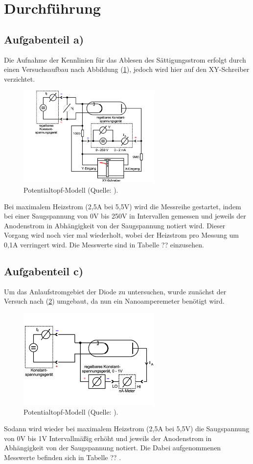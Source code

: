 \newpage
\section{Durchführung}
\subsection{Aufgabenteil a)}
Die Aufnahme der Kennlinien für das Ablesen des Sättigungsstrom erfolgt durch einen Versuchsaufbau nach Abbildung (\ref{fig:aufbau1}), 
jedoch wird hier auf den XY-Schreiber verzichtet.

\begin{figure}
    \centering
       \includegraphics[height=5cm]{aufbau1.pdf}
       \caption{Potentialtopf-Modell (Quelle: \cite{V504}).}
       \label{fig:aufbau1}
\end{figure}

\noindent
Bei maximalem Heizstrom (2,5A bei 5,5V) wird die Messreihe gestartet, 
indem bei einer Saugspannung von 0V bis 250V in Intervallen gemessen und jeweils der Anodenstrom in Abhängigkeit von der Saugspannung notiert wird.
Dieser Vorgang wird noch vier mal wiederholt, wobei der Heizstrom pro Messung um 0,1A verringert wird.
Die Messwerte sind in Tabelle ??%
einzusehen.

\subsection{Aufgabenteil c)}
Um das Anlaufstromgebiet der Diode zu untersuchen, wurde zunächst der Versuch nach (\ref{fig:aufbau2}) umgebaut, 
da nun ein Nanoamperemeter benötigt wird.

\begin{figure}
    \centering
       \includegraphics[height=5cm]{aufbau2.pdf}
       \caption{Potentialtopf-Modell (Quelle: \cite{V504}).}
       \label{fig:aufbau2}
\end{figure}

\noindent
Sodann wird wieder bei maximalem Heizstrom (2,5A bei 5,5V) die Saugspannung von 0V bis 1V Intervallmäßig erhöht 
und jeweils der Anodenstrom in Abhängigkeit von der Saugspannung notiert.
Die Dabei aufgenommenen Messwerte befinden sich in Tabelle ??%
.